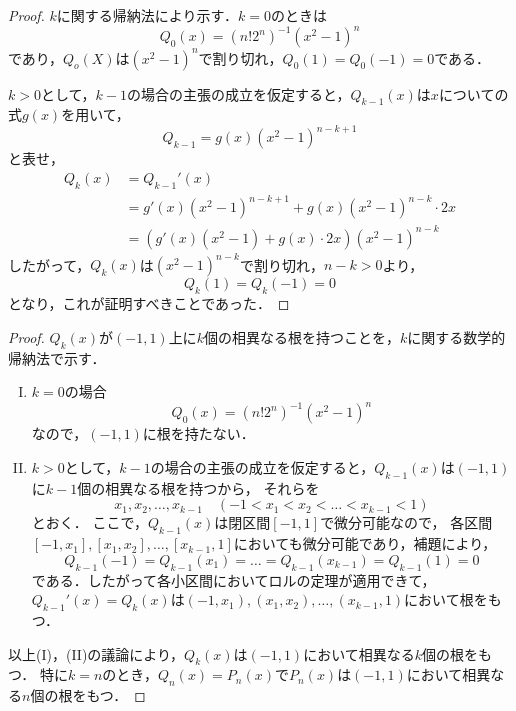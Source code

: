 \documentclass[a4paper,10pt,fleqn]{ltjsarticle}
\begin{document}
\begin{proof}
    $k$に関する帰納法により示す．$k=0$のときは
    \[
        Q_0(x)= (n! 2^n)^{-1} (x^2-1)^n
    \]
    であり，$Q_o(X)$は$(x^2-1)^n$で割り切れ，$Q_0(1)=Q_0(-1)=0$である．

    $k>0$として，$k-1$の場合の主張の成立を仮定すると，$Q_{k-1}(x)$は$x$についての式$g(x)$を用いて，
    \[
        Q_{k-1} = g(x)(x^2-1)^{n-k+1}
    \]
    と表せ，
    \begin{align*}
        Q_k (x) & =Q_{k-1}' (x)                                        \\
                & = g'(x)(x^2-1)^{n-k+1} + g(x) (x^2-1)^{n-k} \cdot 2x \\
                & =(g'(x)(x^2-1)+g(x) \cdot 2x) (x^2-1)^{n-k}
    \end{align*}
    したがって，$Q_k(x)$は$(x^2-1)^{n-k}$で割り切れ，$n-k >0$より，
    \[
        Q_k (1)= Q_k(-1)=0
    \]
    となり，これが証明すべきことであった．
\end{proof}

\begin{leftbar}
    \begin{proof}
        $Q_k (x)$が$(-1,1)$上に$k$個の相異なる根を持つことを，$k$に関する数学的帰納法で示す．
        \begin{enumerate}[(I)]
            \item $k=0$の場合
                  \[
                      Q_0(x)= (n! 2^n)^{-1} (x^2-1)^n
                  \]
                  なので，$(-1,1)$に根を持たない．
            \item $k>0$として，$k-1$の場合の主張の成立を仮定すると，$Q_{k-1}(x)$は$(-1,1)$に$k-1$個の相異なる根を持つから，
                  それらを
                  \[
                      x_1,x_2,\dots,x_{k-1}\quad (-1<x_1<x_2<\dots <x_{k-1}<1)
                  \]とおく．
                  ここで，$Q_{k-1} (x)$は閉区間$[-1,1]$で微分可能なので，
                  各区間$[-1,x_1],[x_1,x_2],\dots,[x_{k-1},1]$においても微分可能であり，補題により，
                  \[
                      Q_{k-1} (-1) = Q_{k-1}(x_1)=\dots = Q_{k-1}(x_{k-1})=Q_{k-1}(1)=0
                  \]
                  である．したがって各小区間においてロルの定理が適用できて，$Q_{k-1}' (x)=Q_k(x)$は$(-1,x_1),(x_1,x_2),\dots,(x_{k-1},1)$において根をもつ．
        \end{enumerate}
        以上(I)，(II)の議論により，$Q_k (x)$は$(-1,1)$において相異なる$k$個の根をもつ．
        特に$k=n$のとき，$Q_n (x)=P_n(x)$で$P_n (x)$は$(-1,1)$において相異なる$n$個の根をもつ．
    \end{proof}
\end{leftbar}
\end{document}
